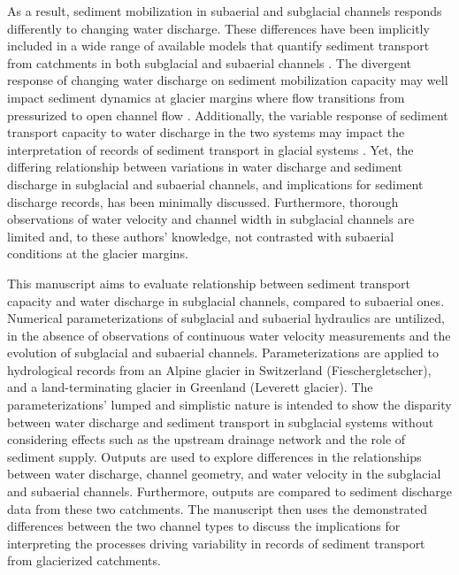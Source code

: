 \documentclass[11pt]{article}
\begin{document}
As a result, sediment mobilization in subaerial and subglacial channels responds differently to changing water discharge.
These differences have been implicitly included in a wide range of available models that  quantify sediment transport from catchments in both subglacial and subaerial channels  \citep[e.g.][]{walder1994,tucker1997,creyts2013,wickert2019,hewitt2019}.
The divergent response of changing water discharge on sediment mobilization capacity may well impact sediment dynamics at glacier margins where flow transitions from pressurized to open channel flow \citep[e.g.][]{lane2016,perolo2018}.
Additionally, the variable response of sediment transport capacity to water discharge in the two systems may impact the interpretation of records of sediment transport in glacial systems \citep[e.g.][]{muller1968,richards2003,swift2005,ganti2016}.
Yet, the differing relationship between variations in water discharge and sediment discharge in subglacial and subaerial channels, and implications for sediment discharge records, has been minimally discussed.
Furthermore, thorough observations of water velocity and channel width in subglacial channels are limited and, to these authors' knowledge, not contrasted with subaerial conditions at the glacier margins. 

This manuscript aims to evaluate relationship between sediment transport capacity and water discharge in subglacial channels, compared to subaerial ones.
Numerical parameterizations of subglacial and subaerial hydraulics are untilized, in the absence of observations of continuous water velocity measurements and the evolution of subglacial and subaerial channels.
Parameterizations are applied to hydrological records from an Alpine glacier in Switzerland (Fieschergletscher), and  a land-terminating glacier in Greenland (Leverett glacier).
The parameterizations' lumped and simplistic nature is intended to show the disparity between water discharge and sediment transport in subglacial systems  without considering effects such as the upstream drainage network and the role of sediment supply.
Outputs are used to explore differences in the relationships between  water discharge, channel geometry, and water velocity in the subglacial and subaerial channels. 
Furthermore, outputs are compared to sediment discharge data from these two catchments.
The manuscript then uses the demonstrated differences between the two channel types to discuss the implications for interpreting the processes driving variability in records of sediment transport from glacierized catchments.
\end{document}
